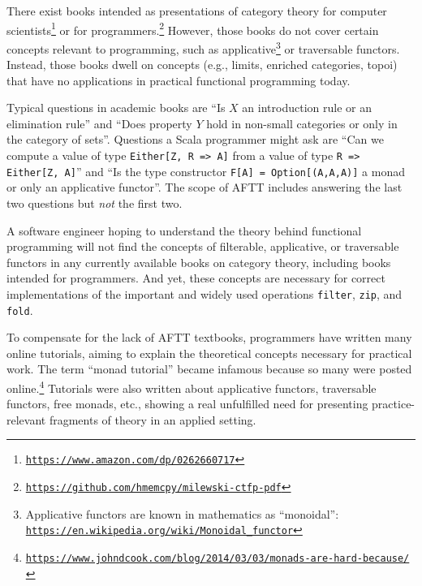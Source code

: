 There exist books intended as presentations of category theory for
computer scientists\footnote{\texttt{\href{https://www.amazon.com/dp/0262660717}{https://www.amazon.com/dp/0262660717}}}
or for programmers.\footnote{\texttt{\href{https://github.com/hmemcpy/milewski-ctfp-pdf}{https://github.com/hmemcpy/milewski-ctfp-pdf}}}
However, those books do not cover certain concepts relevant to programming,
such as applicative\footnote{Applicative functors are known in mathematics as \textsf{``}monoidal\textsf{''}: \texttt{\href{https://en.wikipedia.org/wiki/Monoidal_functor}{https://en.wikipedia.org/wiki/Monoidal\_functor}}}
or traversable functors. Instead, those books dwell on concepts (e.g.,
limits, enriched categories, topoi) that have no applications in practical
functional programming today.

Typical questions in academic books are \textsf{``}Is $X$ an introduction
rule or an elimination rule\textsf{''} and \textsf{``}Does property $Y$ hold in non-small
categories or only in the category of sets\textsf{''}. Questions a Scala programmer
might ask are \textsf{``}Can we compute a value of type \lstinline!Either[Z, R => A]!
from a value of type \lstinline!R => Either[Z, A]!\textsf{''} and \textsf{``}Is the
type constructor \lstinline!F[A] = Option[(A,A,A)]! a monad or only
an applicative functor\textsf{''}. The scope of AFTT includes answering the
last two questions but \emph{not} the first two.

A software engineer hoping to understand the theory behind functional
programming will not find the concepts of filterable, applicative,
or traversable functors in any currently available books on category
theory, including books intended for programmers. And yet, these concepts
are necessary for correct implementations of the important and widely
used operations \lstinline!filter!, \lstinline!zip!, and \lstinline!fold!.

To compensate for the lack of AFTT textbooks, programmers have written
many online tutorials, aiming to explain the theoretical concepts
necessary for practical work. The term \textsf{``}monad tutorial\textsf{''} became
infamous because so many were  posted online.\footnote{\texttt{\href{https://www.johndcook.com/blog/2014/03/03/monads-are-hard-because/}{https://www.johndcook.com/blog/2014/03/03/monads-are-hard-because/}}}
Tutorials were also written about applicative functors, traversable
functors, free monads, etc., showing a real unfulfilled need for presenting
practice-relevant fragments of theory in an applied setting. 

